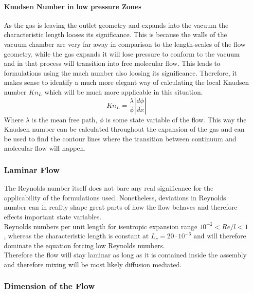 	\paragraph{Knudsen Number in low pressure Zones}
		As the gas is leaving the outlet geometry and expands into the vacuum the characteristic length looses its significance.
		This is because the walls of the vacuum chamber are very far away in comparison to the length-scales of the flow geometry, while the gas expands it will lose pressure to conform to the vacuum and in that process will transition into free molecular flow.
		This leads to formulations using the mach number also loosing its significance.
		Therefore, it makes sense to identify a much more elegant way of calculating the local Knudsen number $Kn_L$ which will be much more applicable in this situation.
		$$
			K n_L = \frac{\lambda}{\phi} \left| \frac{d\phi}{dx} \right|
		$$
		Where $\lambda$ is the mean free path, $\phi$ is some state variable of the flow.
		This way the Knudsen number can be calculated throughout the expansion of the gas and can be used to find the contour lines where the transition between continuum and molecular flow will happen. 
		\cite{bird_dsmc_2013, Grabe2008, LiLam1964}

\subsubsection*{Laminar Flow}
	The Reynolds number itself does not bare any real significance for the applicability of the formulations used. Nonetheless, deviations in Reynolds number can in reality shape great parts of how the flow behaves and therefore effects important state variables.\\
	Reynolds numbers per unit length for isentropic expansion range $10^{-2} < Re/l < 1$, whereas the characteristic length is constant at $L_c = 20\cdot 10^{-6}$ and will therefore dominate the equation forcing low Reynolds numbers. \cite{ames1953compressible}\\
	Therefore the flow will stay laminar as long as it is contained inside the assembly and therefore mixing will be most likely diffusion mediated.
	\cite{comsol_microfluidics_guide}
	
\subsubsection*{Dimension of the Flow}

